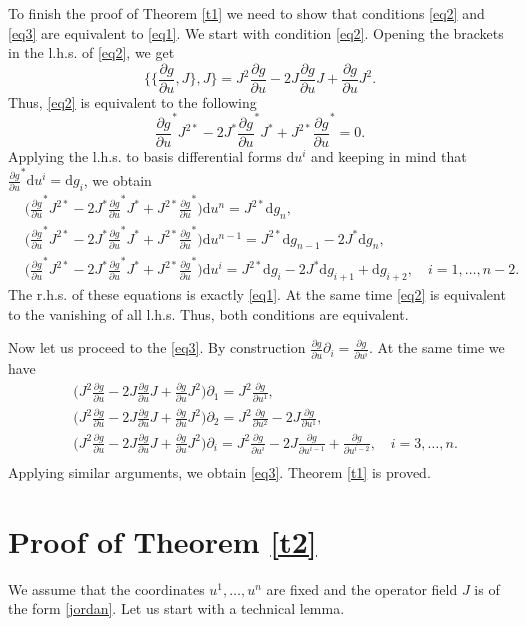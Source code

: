 \documentclass[12pt]{article}
\theoremstyle{remark}
\newcommand{\ddd}{\mathrm{d}}
\newcommand{\pd}[2]{\frac{\partial#1}{\partial#2}}
\begin{document}
To finish the proof of Theorem \ref{t1} we need to show that conditions \eqref{eq2} and \eqref{eq3} are equivalent to \eqref{eq1}. We start with condition \eqref{eq2}. Opening the brackets in the l.h.s. of \eqref{eq2}, we get
$$
\Big\{\Big\{\pd{g}{u}, J\Big\}, J\Big\} = J^2 \pd{g}{u} - 2 J \pd{g}{u} J + \pd{g}{u} J^2.
$$
Thus, \eqref{eq2} is equivalent to the following
$$
\pd{g}{u}^* J^{2*} - 2 J^* \pd{g}{u}^* J^* + J^{2*} \pd{g}{u}^* = 0.
$$
Applying the l.h.s. to basis differential forms $\ddd u^i$ and keeping in mind that $\pd{g}{u}^* \ddd u^i = \ddd g_i$, we obtain
$$
\begin{aligned}
& \Big(\pd{g}{u}^* J^{2*} - 2 J^* \pd{g}{u}^* J^* + J^{2*} \pd{g}{u}^*\Big) \ddd u^n = J^{2*} \ddd g_n, \\
& \Big(\pd{g}{u}^* J^{2*} - 2 J^* \pd{g}{u}^* J^* + J^{2*} \pd{g}{u}^*\Big) \ddd u^{n - 1} = J^{2*} \ddd g_{n - 1} - 2 J^* \ddd g_n, \\
& \Big(\pd{g}{u}^* J^{2*} - 2 J^* \pd{g}{u}^* J^* + J^{2*} \pd{g}{u}^*\Big) \ddd u^i = J^{2*} \ddd g_i - 2 J^* \ddd g_{i + 1} + \ddd g_{i + 2}, \quad i = 1, \dots, n - 2.
\end{aligned}
$$
The r.h.s. of these equations is exactly \eqref{eq1}. At the same time \eqref{eq2} is equivalent to the vanishing of all l.h.s. Thus, both conditions are equivalent.

Now let us proceed to the \eqref{eq3}. By construction $\pd{g}{u} \partial_i = \pd{g}{u^i}$. At the same time we have
$$
\begin{aligned}
& \Big(J^2 \pd{g}{u} - 2 J \pd{g}{u} J + \pd{g}{u} J^2 \Big) \partial_1 = J^2 \pd{g}{u^1}, \\
& \Big(J^2 \pd{g}{u} - 2 J \pd{g}{u} J + \pd{g}{u} J^2 \Big) \partial_2 = J^2 \pd{g}{u^2} - 2 J \pd{g}{u^1}, \\
& \Big(J^2 \pd{g}{u} - 2 J \pd{g}{u} J + \pd{g}{u} J^2 \Big) \partial_i = J^2 \pd{g}{u^{i}} - 2 J \pd{g}{u^{i - 1}} + \pd{g}{u^{i - 2}}, \quad i = 3, \dots, n. \\
\end{aligned}
$$
Applying similar arguments, we obtain \eqref{eq3}. Theorem \ref{t1} is proved.


\section{Proof of Theorem \ref{t2}}\label{proof2}

We assume that the coordinates $u^1, \dots, u^n$ are fixed and the operator field $J$ is of the form \eqref{jordan}. Let us start with a technical lemma.
\end{document}
